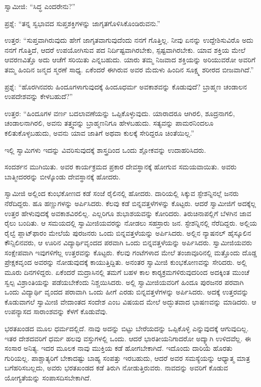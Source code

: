  ಸ್ವಾಮೀಜಿ: “ಸಿದ್ಧ ಎಂದರೇನು?” 

 ಪ್ರಶ್ನೆ: “ತನ್ನ ಸ್ವಭಾವದ ಸುಪ್ತಶಕ್ತಿಗಳನ್ನು ಜಾಗೃತಗೊಳಿಸಿಕೊಂಡಿರುವನು.” 

 ಉತ್ತರ: “ಸುಪ್ತವಾಗಿರುವುದು ಹೇಗೆ ಜಾಗೃತವಾಗುವುದೆಂದು ನನಗೆ ಗೊತ್ತಿಲ್ಲ. ನೀವು ಏನನ್ನು ಉದ್ದೇಶಿಸುವಿರೊ ಅದು ನನಗೆ ಗೊತ್ತಿದೆ, ಆದರೆ ಉಪಯೋಗಿಸುವ ಪದ ನಿರ್ದಿಷ್ಟವಾಗಿರಬೇಕು, ಸ್ಪಷ್ಟವಾಗಿರಬೇಕು. ಯಾವ ಶಕ್ತಿಯ ಮೇಲೆ ಆವರಣವಿತ್ತೊ ಅದು ಆಚೆಗೆ ಸರಿಯಿತು ಎನ್ನಬಹುದು. ಯಾರು ತಮ್ಮ ನಿಜವಾದ ಶಕ್ತಿಯನ್ನು ಅರಿಯುವರೋ ಅವರಿಗೆ ತಮ್ಮ ಹಿಂದಿನ ಜನ್ಮದ ಸ್ಮರಣೆ ಸಾಧ್ಯ. ಏಕೆಂದರೆ ಈಗಿರುವ ಅವರ ಮೆದುಳು ಹಿಂದಿನ ಸೂಕ್ಷ್ಮ ಶರೀರದ ಬೀಜವಾಗಿದೆ.” 

 ಪ್ರಶ್ನೆ: “ಹೊರಗಿನವರು ಹಿಂದೂಗಳಾಗುವುದಕ್ಕೆ ಹಿಂದೂಧರ್ಮ ಅವಕಾಶವನ್ನು ಕೊಡುವುದೆ? ಬ್ರಾಹ್ಮಣ ಚಂಡಾಲನ ಉಪದೇಶವನ್ನು ಕೇಳಬಹುದೆ?” 

 ಉತ್ತರ: “ಹಿಂದೂಗಳ ವರ್ಣ ಬದಲಾವಣೆಯನ್ನು ಒಪ್ಪಿಕೊಳ್ಳುವುದು. ಯಾರಾದರೂ ಆಗಿರಲಿ, ಶೂದ್ರನಾಗಲಿ, ಚಂಡಾಲನಾಗಿರಲಿ, ಅವನು ತತ್ತ್ವವನ್ನು ಬ್ರಾಹ್ಮಣನಿಗೂ ಹೇಳಬಹುದು. ಸತ್ಯವನ್ನು ಪಾಮರನಿಂದಲೂ ಕಲಿತುಕೊಳ್ಳಬಹುದು, ಅವನು ಯಾವ ಜಾತಿಗೆ ಅಥವಾ ಕುಲಕ್ಕೆ ಸೇರಿದ್ದರೂ ಚಿಂತೆಯಿಲ್ಲ.” 

 ಇಲ್ಲಿ ಸ್ವಾಮಿಗಳು ಇದನ್ನು ವಿವರಿಸುವುದಕ್ಕೆ ಶಾಸ್ತ್ರದಿಂದ ಒಂದು ಶ್ಲೋಕವನ್ನು ಉದಾಹರಿಸಿದರು. 

 ಸಂದರ್ಶನ ಮುಗಿಯಿತು. ಅವರ ಕಾರ್ಯಕ್ರಮದ ಪ್ರಕಾರ ದೇವಸ್ಥಾನಕ್ಕೆ ಹೋಗುವ ಸಮಯವಾಯಿತು. ಅವರು ಬಾತ್ಮೀದರರನ್ನು ಬೀಳ್ಕೊಂಡು ದೇವಸ್ಥಾನಕ್ಕೆ ಹೋದರು. 

 ಸ್ವಾಮೀಜಿ ಅಲ್ಲಿಂದ ಕುಂಭಕೋಣದ ಕಡೆ ಸಂಜೆ ರೈಲಿನಲ್ಲಿ ಹೋದರು. ದಾರಿಯಲ್ಲಿ ಸಿಕ್ಕುವ ಸ್ಟೇಶನ್ನಿನಲ್ಲೆ ಜನರು ನೆರೆದಿದ್ದರು. ಹೂ ಹಣ್ಣುಗಳನ್ನು ಅರ್ಪಿಸಿದರು. ಕೆಲವು ಕಡೆ ಬಿನ್ನವತ್ತಳೆಗಳನ್ನು ಕೊಟ್ಟರು. ಆದರೆ ಸ್ವಾಮೀಜಿಗೆ ಅದಕ್ಕೆಲ್ಲ ಉತ್ತರ ಹೇಳುವುದಕ್ಕೆ ಅವಕಾಶವಿರಲಿಲ್ಲ. ಎಲ್ಲರಿಗೂ ಶುಭಾಶಯವನ್ನು ಕೋರಿದರು. ತಿರುಚಿನಾಪಲ್ಲಿಗೆ ಬೆಳಗಿನ ಜಾವ ರೈಲು ಬಂದಿತು. ಆ ಸಮಯದಲ್ಲಿ ಸ್ವಾಮೀಜಿಯವರನ್ನು ನೋಡಲು ಸಹಸ್ರಾರು ಜನ. ಸ್ಟೇಶನ್ನಿನಲ್ಲಿ ನೆರೆದಿದ್ದರು. ಅಲ್ಲಿಯ ರೈಲ್ವೆ ಪ್ಲಾಟ್‌ಫಾರಂ ಮೇಲೆಯೆ ಪುರಜನರು ಒಂದು ಬಿನ್ನವತ್ತಳೆಯನ್ನು ಅರ್ಪಿಸಿದರು. ಅಲ್ಲಿನ ನ್ಯಾಷನಲ್ ಹೈಸ್ಕೂಲಿನ ಕೌನ್ಸಿಲಿನವರು, ಆ ಊರಿನ ವಿದ್ಯಾರ್ಥಿವೃಂದದ ಪರವಾಗಿ ಒಂದು ಬಿನ್ನವತ್ತಳೆಯನ್ನು ಅರ್ಪಿಸಿದರು. ಸ್ವಾಮೀಜಿಯವರು ಸಂಕ್ಷೇಪವಾಗಿ ಇವುಗಳಿಗೆಲ್ಲ ಉತ್ತರವನ್ನು ಕೊಟ್ಟರು. ಕೆಲವು ಗಂಟೆಗಳಾದ ಮೇಲೆ ತಂಜಾವೂರಿನಲ್ಲಿ ಮತ್ತೊಂದು ದೊಡ್ಡ ಪ್ರೇಕ್ಷಕವೃಂದ ಅವರನ್ನು ನೋಡುವುದಕ್ಕೆ ಕಾಯುತ್ತಿದ್ದಿತು. ಅನಂತರ ಸ್ವಾಮೀಜಿ ಕುಂಭಕೋಣವನ್ನು ಸೇರಿದರು. ಅಲ್ಲಿ ಮೂರು ದಿನಗಳಿದ್ದರು. ಏಕೆಂದರೆ ಮದ್ರಾಸಿನಲ್ಲಿ ತಮಗೆ ಬಹಳ ಕಾಲ ಕಾರ‍್ಯಕ್ರಮಗಳಿರುವುದರಿಂದ ಅದಕ್ಕಿಂತ ಮುಂಚೆ ಸ್ವಲ್ಪ ವಿಶ್ರಾಂತಿಯನ್ನು ಪಡೆಯಬೇಕೆಂದು ನಿಶ್ಚಯಿಸಿದರು. ಅಲ್ಲಿ ಸ್ವಾಮೀಜಿಯವರಿಗೆ ಹಿಂದೂ ಪುರಜನರ ಪರವಾಗಿ ಒಂದು ವಿದ್ಯಾರ್ಥಿ ವೃಂದದ ಪರಾವಾಗಿ ಒಂದು ಹೀಗೆ ಎರಡು ಬಿನ್ನವತ್ತಳೆಗಳನ್ನು ಅರ್ಪಿಸಿದರು. ಅದಕ್ಕೆ ಉತ್ತರವನ್ನು ಕೊಡುವಾಗಲೆ ಸ್ವಾಮೀಜಿ ವೇದಾಂತದ ಸಂದೇಶ ಎಂಬ ವಿಷಯದ ಮೇಲೆ ಅದ್ಭುತವಾದ ಭಾಷಣವನ್ನು ಮಾಡಿದರು. ಆ ಉಪನ್ಯಾಸದ ಸಾರಾಂಶವನ್ನು ಕೆಳಗೆ ಕೊಡುವೆವು. 

 ಭರತಖಂಡದ ಮೂಲ ಧರ್ಮದಲ್ಲಿದೆ. ನಾವು ಅದನ್ನು ಬಿಟ್ಟು ಬೇರೆಯದನ್ನು ಒಪ್ಪಿಕೊಳ್ಳಿ ಎನ್ನುವುದಕ್ಕೆ ಆಗುವುದಿಲ್ಲ. ಇತರ ದೇಶದವರಿಗೆ ಧರ್ಮ ಹಲವು ವಸ್ತುಗಳಲ್ಲಿ ಒಂದು. ಆದರೆ ಭಾರತೀಯನಿಗಾದರೋ ಅದ್ಕ್ಕಾಗಿ ಉಳಿದವೆಲ್ಲ. ಈ ಸಂಸಾರ ಅನಿತ್ಯ. ಇದರ ಮೂಲಕ ನಾವು ಮುಕ್ತಿಯ ಕಡೆ ಹೋಗಬೇಕಾಗಿದೆ. ಇದೊಂದು ದಾರಿಯೆ ಹೊರತು ಗುರಿಯಲ್ಲ. ಪಾಶ್ಚಾತ್ಯರಿಗೆ ಬೇಕಾದಷ್ಟು ಬಾಹ್ಯ ಸಂಪತ್ತು ಇರಬಹುದು, ಆದರೆ ಅವರ ಸಮಸ್ಯೆಯನ್ನು ಆಧ್ಯಾತ್ಮ ಮಾತ್ರ ಬಗೆಹರಿಸಬಲ್ಲದು, ಅವರು ಭರತಖಂಡದ ಕಡೆ ತಿರುಗಿ ನೋಡುತ್ತಿರುವರು. ನಾವದನ್ನು ಅವರಿಗೆ ಕೊಡುವ ಯೋಗ್ಯತೆಯನ್ನು ಸಂಪಾಸದಿಸಬೇಕಾಗಿದೆ. 

